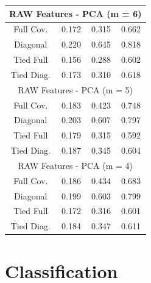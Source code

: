 \documentclass[12pt,a4paper]{article}
\begin{document}
\begin{multicols}{2}
{\begin{tabular}{cccc}
            \hline
            \multicolumn{4}{c}{RAW Features - PCA (m = 6)}                                    \\
            \hline
            Full Cov.  & 0.172                & 0.315                 & 0.662                 \\
            Diagonal   & 0.220                & 0.645                 & 0.818                 \\
            Tied Full  & {\color{red} 0.156 } & {\color{blue} 0.288 } & {\color{blue} 0.602 } \\
            Tied Diag. & 0.173                & 0.310                 & 0.618                 \\

            \hline
            \multicolumn{4}{c}{RAW Features - PCA (m = 5)}                                    \\
            \hline
            Full Cov.  & 0.183                & 0.423                 & 0.748                 \\
            Diagonal   & 0.203                & 0.607                 & 0.797                 \\
            Tied Full  & {\color{red} 0.179 } & {\color{blue} 0.315 } & {\color{blue} 0.592 } \\
            Tied Diag. & 0.187                & 0.345                 & 0.604                 \\

            \hline
            \multicolumn{4}{c}{RAW Features - PCA (m = 4)}                                    \\
            \hline
            Full Cov.  & 0.186                & 0.434                 & 0.683                 \\
            Diagonal   & 0.199                & 0.603                 & 0.799                 \\
            Tied Full  & {\color{red} 0.172 } & {\color{blue} 0.316 } & {\color{blue} 0.601 } \\
            Tied Diag. & 0.184                & 0.347                 & 0.611                 \\
        \end{tabular}
    }
\end{multicols}

\section{Classification}
\end{document}
